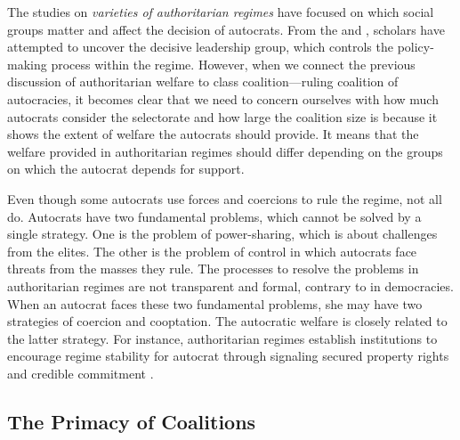 \documentclass[11pt]{article}
\begin{document}
The studies on \textit{varieties of authoritarian regimes} have focused on which social groups matter and affect the decision of autocrats. From the \citet{Geddes1999} and \citet{Geddes2014}, scholars have attempted to uncover the decisive leadership group, which controls the policy-making process within the regime. However, when we connect the previous discussion of authoritarian welfare to class coalition---ruling coalition of autocracies, it becomes clear that we need to concern ourselves with how much autocrats consider the selectorate and how large the coalition size is because it shows the extent of welfare the autocrats should provide. It means that the welfare provided in authoritarian regimes should differ depending on the groups on which the autocrat depends for support.\par

Even though some autocrats use forces and coercions to rule the regime, not all do. Autocrats have two fundamental problems, which cannot be solved by a single strategy. One is the problem of power-sharing, which is about challenges from the elites. The other is the problem of control in which autocrats face threats from the masses they rule. The processes to resolve the problems in authoritarian regimes are not transparent and formal, contrary to in democracies. When an autocrat faces these two fundamental problems, she may have two strategies of coercion and cooptation. The autocratic welfare is closely related to the latter strategy. For instance, authoritarian regimes establish institutions to encourage regime stability for autocrat through signaling secured property rights and credible commitment \citep{Gandhi2007, Wright2008}.

\subsection{The Primacy of Coalitions}
\end{document}
